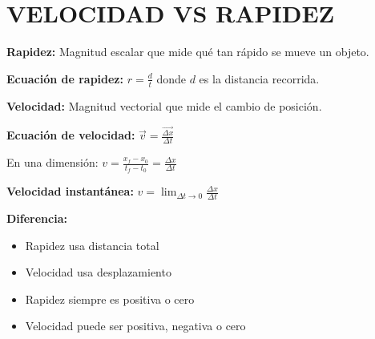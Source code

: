 \section{VELOCIDAD VS RAPIDEZ}

\begin{seccion}
\begin{definicion}
    \textbf{Rapidez:} Magnitud escalar que mide qué tan rápido se mueve un objeto.
\end{definicion}

\begin{ecuacion}
\textbf{Ecuación de rapidez:}
$r = \frac{d}{t}$
donde $d$ es la distancia recorrida.
\end{ecuacion}

\begin{definicion}
    \textbf{Velocidad:} Magnitud vectorial que mide el cambio de posición.
\end{definicion}

\begin{ecuacion}
\textbf{Ecuación de velocidad:}
$\vec{v} = \frac{\vec{\Delta x}}{\Delta t}$

En una dimensión:
$v = \frac{x_f - x_0}{t_f - t_0} = \frac{\Delta x}{\Delta t}$

\textbf{Velocidad instantánea:}
$v = \lim_{\Delta t \to 0} \frac{\Delta x}{\Delta t}$
\end{ecuacion}

\textbf{Diferencia:}
\begin{itemize}
    \item Rapidez usa distancia total
    \item Velocidad usa desplazamiento
    \item Rapidez siempre es positiva o cero
    \item Velocidad puede ser positiva, negativa o cero
\end{itemize}
\end{seccion}

\newpage


